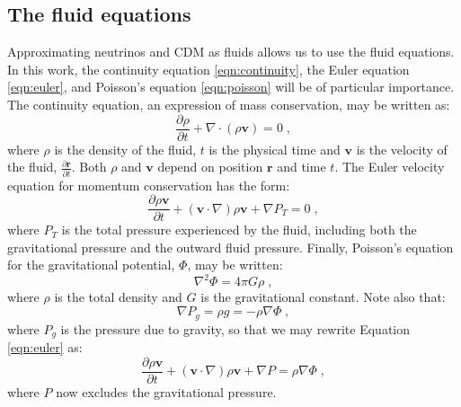 \documentclass[twocolumn,superscriptaddress,prd]{revtex4}
\begin{document}
\subsection{The fluid equations}
\label{sec:Fluids}

Approximating neutrinos and CDM as fluids allows us to
use the fluid equations.  In this work, the
continuity equation \eqref{eqn:continuity}, the Euler
equation \eqref{eqn:euler}, and Poisson's equation \eqref{eqn:poisson} 
will be of particular importance.
The continuity equation, an expression of mass conservation, may be written as:
\begin{equation} \label{eqn:continuity}
  \frac{\partial \rho }{\partial t} +\nabla \cdot ( \rho \mathbf{v} ) = 0 \;,
\end{equation}
where $\rho$ is the density of the fluid, $t$ is the physical time
and $\mathbf{v}$ is the velocity of the fluid, $\frac{\partial
  \mathbf{r}}{\partial t}$.  Both $\rho$ and $\mathbf{v}$ depend on
position $\mathbf{r}$ and time $t$.  %
The
Euler velocity equation for momentum conservation has the form:
\begin{equation}\label{eqn:euler}
  \frac{ \partial \rho \mathbf{v} }{ \partial t} + 
  (\mathbf{v} \cdot \nabla ) \rho \mathbf{v}
+ \nabla P_T = 0 \;,
\end{equation}
where $P_T$ is the total pressure experienced by the fluid, including
both the gravitational pressure and the outward fluid pressure. 
Finally, Poisson's equation for the gravitational potential, $\Phi$, may be written:
\begin{equation}\label{eqn:poisson}
  \nabla^2\Phi=4\pi G \rho \;,
\end{equation}
where $\rho$ is the total density and $G$ is the gravitational constant.  Note also that:
\begin{equation}
  \nabla P_g = \rho g = - \rho \nabla \Phi \;,
\end{equation}
where $P_g$ is the pressure due to gravity, so that we may rewrite Equation \eqref{eqn:euler} as:
\begin{equation}\label{eqn:euler2}
  \frac{ \partial \rho \mathbf{v} }{ \partial t} + 
  (\mathbf{v} \cdot \nabla) \rho \mathbf{v}
+ \nabla P = \rho \nabla \Phi \;,
\end{equation}
where $P$ now excludes the gravitational pressure.

\end{document}
